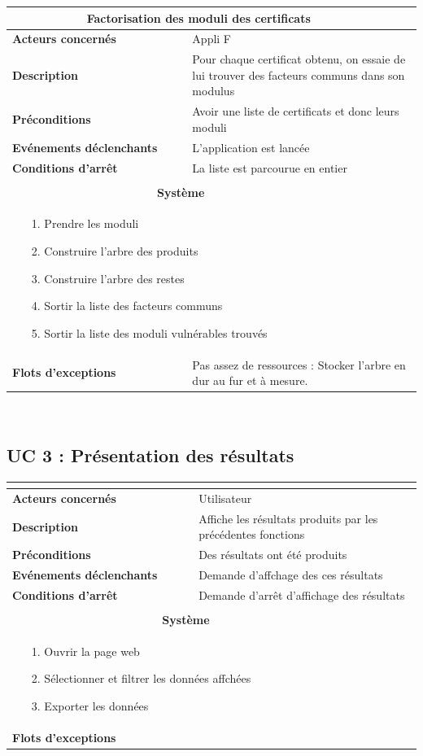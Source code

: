 \documentclass[a4paper,11pt,french]{article}
\newcommand{\fiche}[9] {
	\noindent
\begin{tabular}{|p{4cm}| p{2cm} | p{4cm} | p{.5cm} | p{7cm}|} 
\hline
\rowcolor{blue}
\multicolumn{2}{|l|}{\color{white}\bfseries{Nom}} & \multicolumn{3}{l|}{\color{white}\bfseries{#1}}\\
\hline
\multicolumn{2}{|l|}{\bfseries{Acteurs concernés}} & \multicolumn{3}{m{10.5cm}|}{#2}\\
\hline
\multicolumn{2}{|l|}{\bfseries{Description}} & \multicolumn{3}{m{10.5cm}|}{#3}\\
\hline
\multicolumn{2}{|l|}{\bfseries{Préconditions}} & \multicolumn{3}{m{10.5cm}|}{#4}\\
\hline
\multicolumn{2}{|l|}{\bfseries{Evénements déclenchants}} & \multicolumn{3}{m{10.5cm}|}{#5}\\
\hline
\multicolumn{2}{|l|}{\bfseries{Conditions d'arrêt}} & \multicolumn{3}{m{10.5cm}|}{#6}\\
\hline
\rowcolor{gray}
\multicolumn{5}{|c|}{\bfseries{Description du flot d'événements principal}}\\
\hline
\rowcolor{gray}
\multicolumn{3}{|c|}{\bfseries{Acteur(s)}} & \multicolumn{2}{c|}{\bfseries{Système}}\\
\hline
\multicolumn{3}{|p{7.5cm}|}{#7} & \multicolumn{2}{p{7.5cm}|}{#8}\\
\hline
\multicolumn{2}{|l}{\bfseries{Flots d'exceptions}} & \multicolumn{3}{|p{11.5cm}|}{#9}\\
\hline
\end{tabular}
\\
}
\begin{document}
\fiche
	{Factorisation des moduli des certificats} %
	{Appli F} %
	{Pour chaque certificat obtenu, on essaie de lui trouver des facteurs communs dans son modulus} %
	{Avoir une liste de certificats et donc leurs moduli} %
	{L'application est lancée} %
	{La liste est parcourue en entier} %
	{\begin{itemize}  %
		\item [1.] Prendre les moduli
		\item [2.] Construire l'arbre des produits
		\item [3.] Construire l'arbre des restes
		\item [4.] Sortir la liste des facteurs communs
		\item [5.] Sortir la liste des moduli vulnérables trouvés
	 \end{itemize}
	} 
	{\begin{itemize}  %
		\item []
		\item []
	\end{itemize}
	 }
	{Pas assez de ressources : Stocker l'arbre en dur au fur et à mesure.} %


\subsection{UC 3 : Présentation des résultats}

\fiche
	{} %
	{Utilisateur} %
	{Affiche les résultats produits par les précédentes fonctions} %
	{Des résultats ont été produits} %
	{Demande d'affchage des ces résultats} %
	{Demande d'arrêt d'affichage des résultats} %
	{\begin{itemize}  %
		\item [1.] Ouvrir la page web
		\item [2.] Sélectionner et filtrer les données affchées
		\item [3.] Exporter les données
	 \end{itemize}
	} 
	{\begin{itemize}  %
		\item []
		\item []
	\end{itemize}
	 }
	{} %
\end{document}

